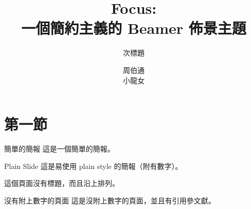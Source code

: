 \documentclass[hyperref={bookmarks=false}]{beamer}
\title{Focus: \\ 一個簡約主義的 Beamer 佈景主題}
\subtitle{次標題}
\author{周伯通 \\ 小龍女}
\institute{單位名稱 \\ 單位地址}
\date{\zhtoday}
\begin{document}

\begin{frame}
  \maketitle %
\end{frame}


\section{第一節} %


\begin{frame}{\iyan 簡單的簡報}
  這是一個簡單的簡報。
\end{frame}


\begin{frame}[plain]{Plain Slide}
  這是易使用 plain style 的簡報（附有數字）。
\end{frame}


\begin{frame}[t]
  這個頁面沒有標題，而且沿上排列。
\end{frame}


\begin{frame}[noframenumbering]{\iyan 沒有附上數字的頁面}
  這是沒附上數字的頁面，並且有引用參文獻\cite{knuth74}。
\end{frame}

\end{document}
